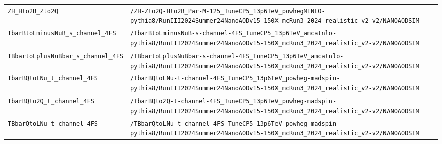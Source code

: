 \begin{longtable}{@{}>{\RaggedRight\arraybackslash}p{} >{\RaggedRight\arraybackslash}p{}@{}}
\addlinespace[2pt]
\texttt{ZH\_\allowbreak{}Hto2B\_\allowbreak{}Zto2Q} & \texttt{/\allowbreak{}ZH-\allowbreak{}Zto2Q-\allowbreak{}Hto2B\_\allowbreak{}Par-\allowbreak{}M-\allowbreak{}125\_\allowbreak{}TuneCP5\_\allowbreak{}13p6TeV\_\allowbreak{}powhegMINLO-\allowbreak{}pythia8/\allowbreak{}RunIII2024Summer24NanoAODv15-\allowbreak{}150X\_\allowbreak{}mcRun3\_\allowbreak{}2024\_\allowbreak{}realistic\_\allowbreak{}v2-\allowbreak{}v2/\allowbreak{}NANOAODSIM} \\
\addlinespace[2pt]
\texttt{TbarBtoLminusNuB\_\allowbreak{}s\_\allowbreak{}channel\_\allowbreak{}4FS} & \texttt{/\allowbreak{}TbarBtoLminusNuB-\allowbreak{}s-\allowbreak{}channel-\allowbreak{}4FS\_\allowbreak{}TuneCP5\_\allowbreak{}13p6TeV\_\allowbreak{}amcatnlo-\allowbreak{}pythia8/\allowbreak{}RunIII2024Summer24NanoAODv15-\allowbreak{}150X\_\allowbreak{}mcRun3\_\allowbreak{}2024\_\allowbreak{}realistic\_\allowbreak{}v2-\allowbreak{}v2/\allowbreak{}NANOAODSIM} \\
\addlinespace[2pt]
\texttt{TBbartoLplusNuBbar\_\allowbreak{}s\_\allowbreak{}channel\_\allowbreak{}4FS} & \texttt{/\allowbreak{}TBbartoLplusNuBbar-\allowbreak{}s-\allowbreak{}channel-\allowbreak{}4FS\_\allowbreak{}TuneCP5\_\allowbreak{}13p6TeV\_\allowbreak{}amcatnlo-\allowbreak{}pythia8/\allowbreak{}RunIII2024Summer24NanoAODv15-\allowbreak{}150X\_\allowbreak{}mcRun3\_\allowbreak{}2024\_\allowbreak{}realistic\_\allowbreak{}v2-\allowbreak{}v2/\allowbreak{}NANOAODSIM} \\
\addlinespace[2pt]
\texttt{TbarBQtoLNu\_\allowbreak{}t\_\allowbreak{}channel\_\allowbreak{}4FS} & \texttt{/\allowbreak{}TbarBQtoLNu-\allowbreak{}t-\allowbreak{}channel-\allowbreak{}4FS\_\allowbreak{}TuneCP5\_\allowbreak{}13p6TeV\_\allowbreak{}powheg-\allowbreak{}madspin-\allowbreak{}pythia8/\allowbreak{}RunIII2024Summer24NanoAODv15-\allowbreak{}150X\_\allowbreak{}mcRun3\_\allowbreak{}2024\_\allowbreak{}realistic\_\allowbreak{}v2-\allowbreak{}v2/\allowbreak{}NANOAODSIM} \\
\addlinespace[2pt]
\texttt{TbarBQto2Q\_\allowbreak{}t\_\allowbreak{}channel\_\allowbreak{}4FS} & \texttt{/\allowbreak{}TbarBQto2Q-\allowbreak{}t-\allowbreak{}channel-\allowbreak{}4FS\_\allowbreak{}TuneCP5\_\allowbreak{}13p6TeV\_\allowbreak{}powheg-\allowbreak{}madspin-\allowbreak{}pythia8/\allowbreak{}RunIII2024Summer24NanoAODv15-\allowbreak{}150X\_\allowbreak{}mcRun3\_\allowbreak{}2024\_\allowbreak{}realistic\_\allowbreak{}v2-\allowbreak{}v2/\allowbreak{}NANOAODSIM} \\
\addlinespace[2pt]
\texttt{TBbarQtoLNu\_\allowbreak{}t\_\allowbreak{}channel\_\allowbreak{}4FS} & \texttt{/\allowbreak{}TBbarQtoLNu-\allowbreak{}t-\allowbreak{}channel-\allowbreak{}4FS\_\allowbreak{}TuneCP5\_\allowbreak{}13p6TeV\_\allowbreak{}powheg-\allowbreak{}madspin-\allowbreak{}pythia8/\allowbreak{}RunIII2024Summer24NanoAODv15-\allowbreak{}150X\_\allowbreak{}mcRun3\_\allowbreak{}2024\_\allowbreak{}realistic\_\allowbreak{}v2-\allowbreak{}v2/\allowbreak{}NANOAODSIM} \\

\end{longtable}
